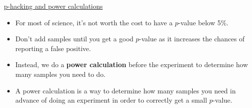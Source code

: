 \documentclass[12pt, titlepage, french]{report}
\begin{document}
\begin{YTB_SUMM_AUTO_NUMB}[label = {SQ-Phack-power}]{\href{https://www.youtube.com/watch?v=UFhJefdVCjE}{p-hacking and power calculations}}
\begin{itemize}[leftmargin = *]
	\item	For most of science, it's not worth the cost to have a $p$-value below 5\%.
	\item	Don't add samples until you get a good $p$-value as it increases the chances of reporting a false positive.
	\item	Instead, we do a \textbf{power calculation} before the experiment to determine how many samples you need to do.
	\item	A power calculation is a way to determine how many samples you need in advance of doing an experiment in order to correctly get a small $p$-value.
\end{itemize}


\end{YTB_SUMM_AUTO_NUMB}
\end{document}
